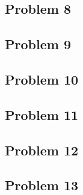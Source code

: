 \documentclass{article}
\begin{document}
\begin{center}

\end{center}

\subsection*{Problem 8}
\subsection*{Problem 9}
\subsection*{Problem 10}
\subsection*{Problem 11}
\subsection*{Problem 12}
\subsection*{Problem 13}

%
\end{document}

